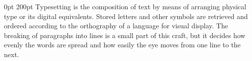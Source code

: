 \documentclass{article}
\begin{document}
  \emergencystretch=10pt  0pt 200pt Typesetting is the composition of text by means of arranging physical type or its digital equivalents. Stored letters and other symbols are retrieved and ordered according to the orthography of a language for visual display. The breaking of paragraphs into lines is a small part of this craft, but it decides how evenly the words are spread and how easily the eye moves from one line to the next.
\end{document}
